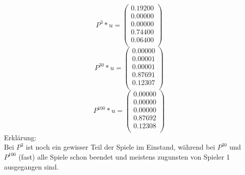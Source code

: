 \documentclass{article}
\begin{document}
\[
P^3 * u=
  \begin{pmatrix}
    0.19200 \\
    0.00000 \\
    0.00000 \\
    0.74400 \\
    0.06400 \\
    
  \end{pmatrix}
\]
\[
P^30 * u=
  \begin{pmatrix}
    0.00000 \\
    0.00001 \\
    0.00001 \\
    0.87691 \\
    0.12307 \\
    
  \end{pmatrix}
\]
\[
P^100 * u=
  \begin{pmatrix}
    0.00000 \\
    0.00000 \\
    0.00000 \\
    0.87692 \\
    0.12308 \\
    
  \end{pmatrix}
\]
Erklärung: \\
Bei $P^3$ ist noch ein gewisser Teil der Spiele im Einstand, während bei $P^{30}$ und $P^{100}$ (fast) alle Spiele schon beendet und meistens zugunsten von Spieler 1 ausgegangen sind.

\subsubsection{}
\end{document}
